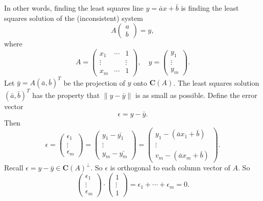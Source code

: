 \documentclass[12pt]{article}
\begin{document}
In other words, finding the least squares line $y=\bar{a}x+\bar{b}$ is finding the least squares solution of the (inconsistent) system 
\begin{equation*}
	A\begin{pmatrix} a \\ b \end{pmatrix} = y,
\end{equation*}
where 
\begin{equation*}
	A = \begin{pmatrix} x_1 & \cdots & 1 \\ \vdots & & \vdots \\ x_m & \cdots & 1 \end{pmatrix},\quad y=\begin{pmatrix} y_1 \\ \vdots \\ y_m \end{pmatrix}.
\end{equation*}
Let $\bar{y}=A(\bar{a}, \bar{b})^T$ be the projection of $y$ onto $\mathbf{C}(A)$. The least squares solution $(\bar{a}, \bar{b})^T$ has the property that $\|y-\bar{y}\|$ is as small as possible. Define the error vector 
\begin{equation*}
	\epsilon = y - \bar{y}.
\end{equation*}
Then 
\begin{equation*}
	\epsilon = \begin{pmatrix} \epsilon_1 \\ \vdots \\ \epsilon_m \end{pmatrix} = \begin{pmatrix} y_1-\bar{y_1} \\ \vdots \\ y_m-\bar{y_m} \end{pmatrix} = \begin{pmatrix} y_1 - (\bar{a}x_1+\bar{b}) \\ \vdots \\ v_m - (\bar{a}x_m+\bar{b}) \end{pmatrix}.
\end{equation*}
Recall $\epsilon=y-\bar{y}\in\mathbf{C}(A)^\perp$. So $\epsilon$ is orthogonal to each column vector of $A$. So 
\begin{equation*}
	\begin{pmatrix} \epsilon_1 \\ \vdots \\ \epsilon_m \end{pmatrix} \cdot \begin{pmatrix} 1 \\ \vdots \\ 1 \end{pmatrix} = \epsilon_1 + \cdots + \epsilon_m = 0.
\end{equation*}
\end{document}
